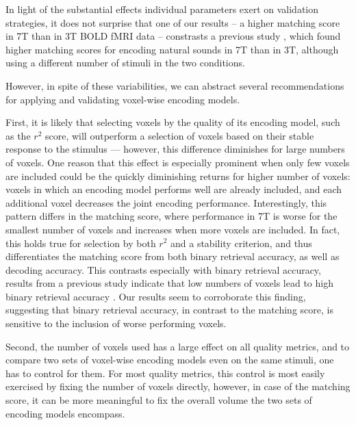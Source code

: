 In light of the substantial effects individual parameters exert on validation strategies, it does not surprise that one of our results -- a higher matching score in 7T than in 3T BOLD fMRI data -- constrasts a  previous study \citep{SF14}, which found higher matching scores for encoding natural sounds in 7T than in 3T, although using a different number of stimuli in the two conditions.

However, in spite of these variabilities, we can abstract several recommendations for applying and validating voxel-wise encoding models.

First, it is likely that selecting voxels by the quality of its encoding model, such as the $r^{2}$ score, will outperform a selection of voxels based on their stable response to the stimulus --- however, this difference diminishes for large numbers of voxels. One reason that this effect is especially prominent when only few voxels are included could be the quickly diminishing returns for higher number of voxels: voxels in which  an encoding model performs well are already included, and each additional voxel decreases the joint encoding performance. Interestingly, this pattern differs in the matching score, where performance in 7T is worse for the smallest number of voxels and increases when more voxels are included. In fact, this holds true for selection by both $r^{2}$ and a stability criterion, and thus differentiates the matching score from both binary retrieval accuracy, as well as decoding accuracy. This contrasts especially with binary retrieval accuracy, results from a previous study indicate that low numbers of voxels lead to high binary retrieval accuracy \citep{hoefle2018identifying}. Our results seem to corroborate this finding, suggesting that binary retrieval accuracy, in contrast to the matching score, is sensitive to the inclusion of worse performing voxels.

Second, the number of voxels used has a large effect on all quality metrics, and to compare two sets of voxel-wise encoding models even on the same stimuli, one has to control for them. For most quality metrics, this control is most easily exercised by fixing the number of voxels directly, however, in case of the matching score, it can be more meaningful to fix the overall volume the two sets of encoding models encompass.

